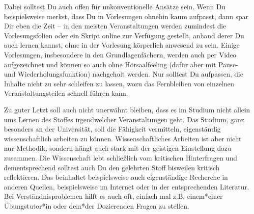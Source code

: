 {Dabei solltest Du auch offen für unkonventionelle Ansätze sein. Wenn Du beispielsweise merkst, dass Du in Vorlesungen ohnehin kaum aufpasst, dann spar Dir eben die Zeit – in den meisten Veranstaltungen werden zumindest die Vorlesungsfolien oder ein Skript online zur Verfügung gestellt, anhand derer Du auch lernen kannst, ohne in der Vorlesung körperlich anwesend zu sein. Einige Vorlesungen, insbesondere in den Grundlagenfächern, werden auch per Video aufgezeichnet und können so auch ohne Hörsaalfeeling (dafür aber mit Pause- und Wiederholungsfunktion) nachgeholt werden. Nur solltest Du aufpassen, die Inhalte nicht zu sehr schleifen zu lassen, wozu das Fernbleiben von einzelnen Veranstaltungsteilen schnell führen kann.

Zu guter Letzt soll auch nicht unerwähnt bleiben, dass es im Studium nicht allein ums Lernen des Stoffes irgendwelcher Veranstaltungen geht. Das Studium, ganz besonders an der Universität, soll die Fähigkeit vermitteln, eigenständig wissenschaftlich arbeiten zu können. Wissenschaftliches Arbeiten ist aber nicht nur Methodik, sondern hängt auch stark mit der geistigen Einstellung dazu zusammen. Die Wissenschaft lebt schließlich vom kritischen Hinterfragen und dementsprechend solltest auch Du den gelehrten Stoff bisweilen kritisch reflektieren. Das beinhaltet beispielsweise auch eigenständige Recherche in anderen Quellen, beispielsweise im Internet oder in der entsprechenden Literatur. Bei Verständnisproblemen hilft es auch oft, einfach mal z.B. einem*einer Übungstutor*in oder dem*der Dozierenden Fragen zu stellen.
}
{}

\vfill
{}

\newpage
